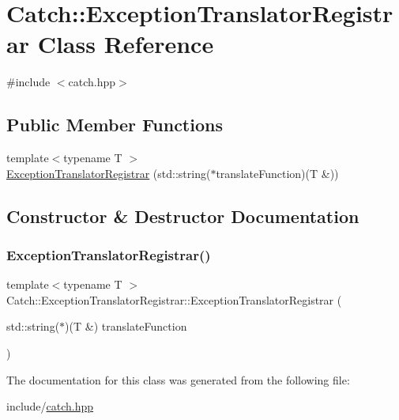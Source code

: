 \hypertarget{class_catch_1_1_exception_translator_registrar}{}\section{Catch\+:\+:Exception\+Translator\+Registrar Class Reference}
\label{class_catch_1_1_exception_translator_registrar}


{\ttfamily \#include $<$catch.\+hpp$>$}

\subsection*{Public Member Functions}
\begin{DoxyCompactItemize}
\item 
{\footnotesize template$<$typename T $>$ }\\\mbox{\hyperlink{class_catch_1_1_exception_translator_registrar_aa73229de911f26b1df6c6c87c4d9e04e}{Exception\+Translator\+Registrar}} (std\+::string($\ast$translate\+Function)(T \&))
\end{DoxyCompactItemize}


\subsection{Constructor \& Destructor Documentation}
\mbox{\label{class_catch_1_1_exception_translator_registrar_aa73229de911f26b1df6c6c87c4d9e04e}} 
\subsubsection{\texorpdfstring{Exception\+Translator\+Registrar()}{ExceptionTranslatorRegistrar()}}
{\footnotesize\ttfamily template$<$typename T $>$ \\
Catch\+::\+Exception\+Translator\+Registrar\+::\+Exception\+Translator\+Registrar (\begin{DoxyParamCaption}\item[{std\+::string($\ast$)(T \&)}]{translate\+Function }\end{DoxyParamCaption})\hspace{0.3cm}{\ttfamily [inline]}}



The documentation for this class was generated from the following file\+:\begin{DoxyCompactItemize}
\item 
include/\mbox{\hyperlink{catch_8hpp}{catch.\+hpp}}\end{DoxyCompactItemize}
